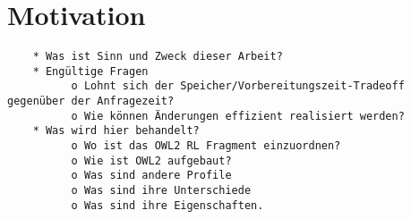 \chapter{Motivation}

\begin{verbatim}
    * Was ist Sinn und Zweck dieser Arbeit?
    * Engültige Fragen
          o Lohnt sich der Speicher/Vorbereitungszeit-Tradeoff gegenüber der Anfragezeit?
          o Wie können Änderungen effizient realisiert werden? 
    * Was wird hier behandelt?
          o Wo ist das OWL2 RL Fragment einzuordnen?
          o Wie ist OWL2 aufgebaut?
          o Was sind andere Profile
          o Was sind ihre Unterschiede
          o Was sind ihre Eigenschaften. 
\end{verbatim}